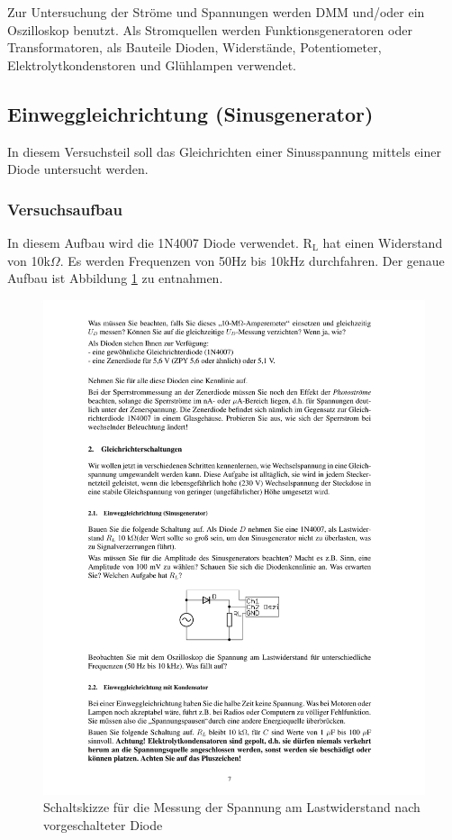 \documentclass[12pt,a4paper]{article}
\begin{document}
Zur Untersuchung der Ströme und Spannungen werden DMM und/oder ein Oszilloskop benutzt. Als Stromquellen werden Funktionsgeneratoren oder Transformatoren, als Bauteile Dioden, Widerstände, Potentiometer, Elektrolytkondenstoren und Glühlampen verwendet.

\subsection{Einweggleichrichtung (Sinusgenerator)}
In diesem Versuchsteil soll das Gleichrichten einer Sinusspannung mittels einer Diode untersucht werden.
\subsubsection{Versuchsaufbau}
In diesem Aufbau wird die 1N4007 Diode verwendet. R$_\text{L}$ hat einen Widerstand von 10k$\Omega$. Es werden Frequenzen von 50Hz bis 10kHz durchfahren. Der genaue Aufbau ist Abbildung \ref{fig:2_1} zu entnahmen.

\begin{figure}[H] 
  \centering
    \includegraphics[trim = 10mm 80mm 10mm 160mm, clip, scale = 1]{ep2_14[Page7].pdf}
  	\caption[Schaltskizze für die Messung der Spannung am Lastwiderstand nach vorgeschalteter Diode]{Schaltskizze für die Messung der Spannung am Lastwiderstand nach vorgeschalteter Diode\footnotemark}
  \label{fig:2_1}
\end{figure}
\end{document}
